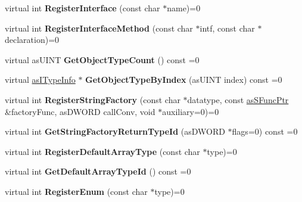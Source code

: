 \begin{DoxyCompactItemize}
\item 
\mbox{\label{classas_i_script_engine_ae2d89b82561b7f9843f35693c664589f}} 
virtual int {\bfseries Register\+Interface} (const char $\ast$name)=0
\item 
\mbox{\label{classas_i_script_engine_a43bd2c12c94a55c22be76d209de93f1a}} 
virtual int {\bfseries Register\+Interface\+Method} (const char $\ast$intf, const char $\ast$declaration)=0
\item 
\mbox{\label{classas_i_script_engine_ac2667fbe30dd00ed14bc14e6ef7fc725}} 
virtual as\+U\+I\+NT {\bfseries Get\+Object\+Type\+Count} () const =0
\item 
\mbox{\label{classas_i_script_engine_afac08d4f81e587031c7863574c6783ba}} 
virtual \hyperlink{classas_i_type_info}{as\+I\+Type\+Info} $\ast$ {\bfseries Get\+Object\+Type\+By\+Index} (as\+U\+I\+NT index) const =0
\item 
\mbox{\label{classas_i_script_engine_ac238aa44f91bad0b9025d956c5555575}} 
virtual int {\bfseries Register\+String\+Factory} (const char $\ast$datatype, const \hyperlink{structas_s_func_ptr}{as\+S\+Func\+Ptr} \&factory\+Func, as\+D\+W\+O\+RD call\+Conv, void $\ast$auxiliary=0)=0
\item 
\mbox{\label{classas_i_script_engine_afb3935d85494231e2f02af5816ba9830}} 
virtual int {\bfseries Get\+String\+Factory\+Return\+Type\+Id} (as\+D\+W\+O\+RD $\ast$flags=0) const =0
\item 
\mbox{\label{classas_i_script_engine_ac9451feece1297eba8d1649036039e82}} 
virtual int {\bfseries Register\+Default\+Array\+Type} (const char $\ast$type)=0
\item 
\mbox{\label{classas_i_script_engine_ae86e5444979b0abd92777be83c53fc80}} 
virtual int {\bfseries Get\+Default\+Array\+Type\+Id} () const =0
\item 
\mbox{\label{classas_i_script_engine_abed6e77f2a532c8a4f528650fa137d37}} 
virtual int {\bfseries Register\+Enum} (const char $\ast$type)=0

\end{DoxyCompactItemize}

